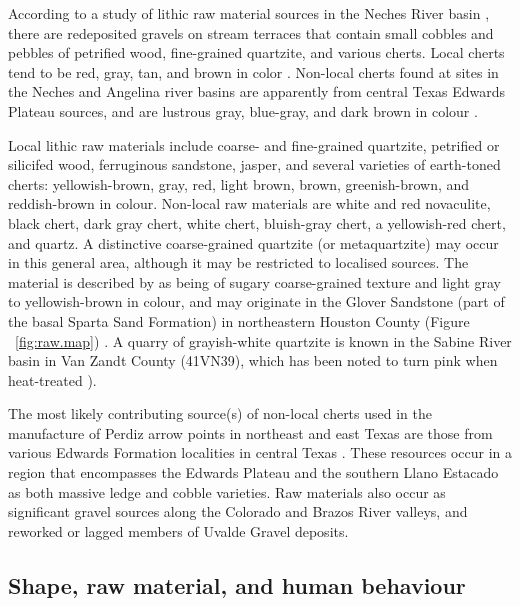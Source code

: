 \documentclass[review]{elsarticle}
\begin{document}
According to a study of lithic raw material sources in the Neches River basin \citet[69]{RN1253}, there are redeposited gravels on stream terraces that contain small cobbles and pebbles of petrified wood, fine-grained quartzite, and various cherts. Local cherts tend to be red, gray, tan, and brown in color \cite[66]{RN1253}. Non-local cherts found at sites in the Neches and Angelina river basins are apparently from central Texas Edwards Plateau sources, and are lustrous gray, blue-gray, and dark brown in colour \cite{RN1253}.

Local lithic raw materials include coarse- and fine-grained quartzite, petrified or silicifed wood, ferruginous sandstone, jasper, and several varieties of earth-toned cherts: yellowish-brown, gray, red, light brown, brown, greenish-brown, and reddish-brown in colour. Non-local raw materials are white and red novaculite, black chert, dark gray chert, white chert, bluish-gray chert, a yellowish-red chert, and quartz. A distinctive coarse-grained quartzite (or metaquartzite) may occur in this general area, although it may be restricted to localised sources. The material is described by \citet[67]{RN1253} as being of sugary coarse-grained texture and light gray to yellowish-brown in colour, and may originate in the Glover Sandstone (part of the basal Sparta Sand Formation) in northeastern Houston County (Figure ~\ref{fig:raw.map}) \cite[69]{RN1253}. A quarry of grayish-white quartzite is known in the Sabine River basin in Van Zandt County (41VN39), which has been noted to turn pink when heat-treated \cite{RN1898}).

The most likely contributing source(s) of non-local cherts used in the manufacture of Perdiz arrow points in northeast and east Texas are those from various Edwards Formation localities in central Texas \citep{RN439,RN2145}. These resources occur in a region that encompasses the Edwards Plateau and the southern Llano Estacado as both massive ledge and cobble varieties. Raw materials also occur as significant gravel sources along the Colorado and Brazos River valleys, and reworked or lagged members of Uvalde Gravel deposits.

\subsection*{Shape, raw material, and human behaviour}
\end{document}
